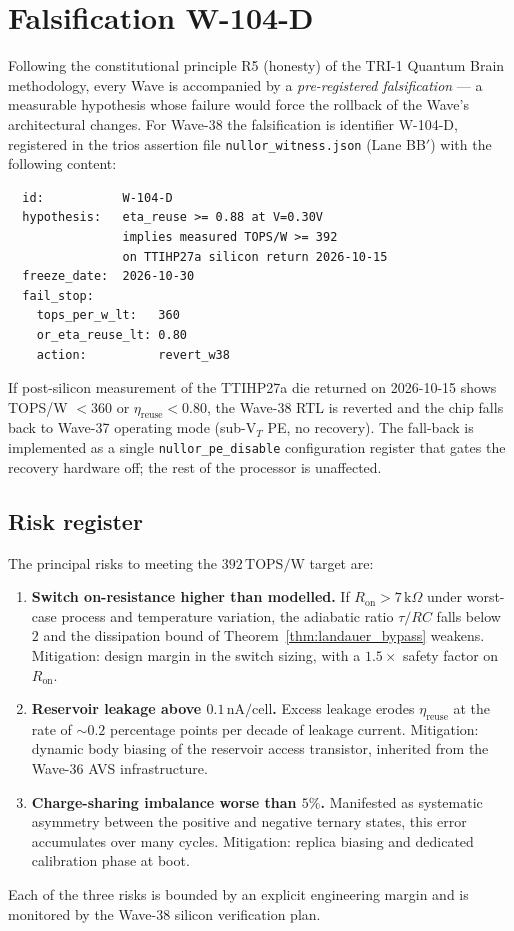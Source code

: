 \section{Falsification W-104-D}
\label{sec:falsification}

Following the constitutional principle R5 (honesty) of the TRI-1 Quantum Brain
methodology, every Wave is accompanied by a \emph{pre-registered falsification}
--- a measurable hypothesis whose failure would force the rollback of the Wave's
architectural changes.  For Wave-38 the falsification is identifier W-104-D,
registered in the trios assertion file \texttt{nullor\_witness.json} (Lane BB$'$)
with the following content:
\begin{verbatim}
  id:           W-104-D
  hypothesis:   eta_reuse >= 0.88 at V=0.30V
                implies measured TOPS/W >= 392
                on TTIHP27a silicon return 2026-10-15
  freeze_date:  2026-10-30
  fail_stop:
    tops_per_w_lt:   360
    or_eta_reuse_lt: 0.80
    action:          revert_w38
\end{verbatim}
If post-silicon measurement of the TTIHP27a die returned on 2026-10-15 shows
TOPS/W $< 360$ or $\eta_{\text{reuse}} < 0.80$, the Wave-38 RTL is reverted and the
chip falls back to Wave-37 operating mode (sub-V$_T$ PE, no recovery).  The
fall-back is implemented as a single \texttt{nullor\_pe\_disable} configuration
register that gates the recovery hardware off; the rest of the processor is
unaffected.

\subsection{Risk register}
\label{subsec:risk_register}

The principal risks to meeting the $392\,\text{TOPS/W}$ target are:
\begin{enumerate}
  \item \textbf{Switch on-resistance higher than modelled.}  If $R_{\text{on}}
    > 7\,\text{k}\Omega$ under worst-case process and temperature variation, the
    adiabatic ratio $\tau / RC$ falls below $2$ and the dissipation bound of
    Theorem~\ref{thm:landauer_bypass} weakens.  Mitigation: design margin in the
    switch sizing, with a $1.5\times$ safety factor on $R_{\text{on}}$.
  \item \textbf{Reservoir leakage above $0.1\,\text{nA/cell}$.}  Excess leakage
    erodes $\eta_{\text{reuse}}$ at the rate of $\sim 0.2$ percentage points per
    decade of leakage current.  Mitigation: dynamic body biasing of the reservoir
    access transistor, inherited from the Wave-36 AVS infrastructure.
  \item \textbf{Charge-sharing imbalance worse than $5\%$.}  Manifested as
    systematic asymmetry between the positive and negative ternary states, this
    error accumulates over many cycles.  Mitigation: replica biasing and dedicated
    calibration phase at boot.
\end{enumerate}
Each of the three risks is bounded by an explicit engineering margin and is
monitored by the Wave-38 silicon verification plan.

